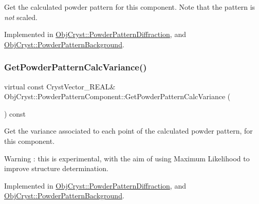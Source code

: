 Get the calculated powder pattern for this component. Note that the pattern is {\itshape not} scaled. 

Implemented in \mbox{\hyperlink{class_obj_cryst_1_1_powder_pattern_diffraction_a29b64d9d3d36eff816bd6dd2ce61a3c7}{Obj\+Cryst\+::\+Powder\+Pattern\+Diffraction}}, and \mbox{\hyperlink{class_obj_cryst_1_1_powder_pattern_background_aeff3379aae4bd4ff3d6ff353ce8f7f96}{Obj\+Cryst\+::\+Powder\+Pattern\+Background}}.

\mbox{\label{class_obj_cryst_1_1_powder_pattern_component_ad67b39669fd0d336b01937ee81a59ddc}} 
\subsubsection{\texorpdfstring{GetPowderPatternCalcVariance()}{GetPowderPatternCalcVariance()}}
{\footnotesize\ttfamily virtual const Cryst\+Vector\+\_\+\+R\+E\+AL\& Obj\+Cryst\+::\+Powder\+Pattern\+Component\+::\+Get\+Powder\+Pattern\+Calc\+Variance (\begin{DoxyParamCaption}{ }\end{DoxyParamCaption}) const\hspace{0.3cm}{\ttfamily [pure virtual]}}

Get the variance associated to each point of the calculated powder pattern, for this component.

\begin{DoxyWarning}{Warning}
\+: this is experimental, with the aim of using Maximum Likelihood to improve structure determination. 
\end{DoxyWarning}


Implemented in \mbox{\hyperlink{class_obj_cryst_1_1_powder_pattern_diffraction_a779d369f39ab01390caf28eb539bfc9e}{Obj\+Cryst\+::\+Powder\+Pattern\+Diffraction}}, and \mbox{\hyperlink{class_obj_cryst_1_1_powder_pattern_background_a75c931bd3e0370e7434f75d70ba51295}{Obj\+Cryst\+::\+Powder\+Pattern\+Background}}.

\mbox{\label{class_obj_cryst_1_1_powder_pattern_component_ac54b7ae5a177492de681afc2cbed72eb}} 
